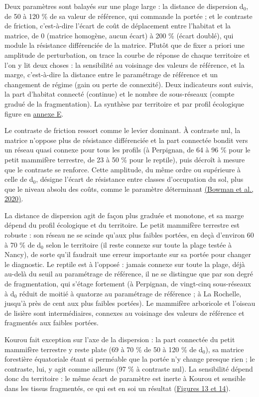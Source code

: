 \documentclass[a4paper,11pt]{report}
\begin{document}
Deux paramètres sont balayés sur une plage large : la distance de dispersion d$_{0}$, de 50 à 120 \% de sa valeur de référence, qui commande la portée ; et le contraste de friction, c'est-à-dire l'écart de coût de déplacement entre l'habitat et la matrice, de 0 (matrice homogène, aucun écart) à 200 \% (écart doublé), qui module la résistance différenciée de la matrice. Plutôt que de fixer a priori une amplitude de perturbation, on trace la courbe de réponse de chaque territoire et l'on y lit deux choses : la sensibilité au voisinage des valeurs de référence, et la marge, c'est-à-dire la distance entre le paramétrage de référence et un changement de régime (gain ou perte de connexité). Deux indicateurs sont suivis, la part d'habitat connecté (continue) et le nombre de sous-réseaux (compte gradué de la fragmentation). La synthèse par territoire et par profil écologique figure en \hyperref[annexe:E]{annexe E}.

Le contraste de friction ressort comme le levier dominant. À contraste nul, la matrice n'oppose plus de résistance différenciée et la part connectée bondit vers un réseau quasi connexe pour tous les profils (à Perpignan, de 64 à 96 \% pour le petit mammifère terrestre, de 23 à 50 \% pour le reptile), puis décroît à mesure que le contraste se renforce. Cette amplitude, du même ordre ou supérieure à celle de d$_{0}$, désigne l'écart de résistance entre classes d'occupation du sol, plus que le niveau absolu des coûts, comme le paramètre déterminant \hyperref[sec:bibliographie]{(Bowman et al., 2020)}.

La distance de dispersion agit de façon plus graduée et monotone, et sa marge dépend du profil écologique et du territoire. Le petit mammifère terrestre est robuste : son réseau ne se scinde qu'aux plus faibles portées, en deçà d'environ 60 à 70 \% de d$_{0}$ selon le territoire (il reste connexe sur toute la plage testée à Nancy), de sorte qu'il faudrait une erreur importante sur sa portée pour changer le diagnostic. Le reptile est à l'opposé : jamais connexe sur toute la plage, déjà au-delà du seuil au paramétrage de référence, il ne se distingue que par son degré de fragmentation, qui s'étage fortement (à Perpignan, de vingt-cinq sous-réseaux à d$_{0}$ réduit de moitié à quatorze au paramétrage de référence ; à La Rochelle, jusqu'à près de cent aux plus faibles portées). Le mammifère arboricole et l'oiseau de lisière sont intermédiaires, connexes au voisinage des valeurs de référence et fragmentés aux faibles portées.

Kourou fait exception sur l'axe de la dispersion : la part connectée du petit mammifère terrestre y reste plate (69 à 70 \% de 50 à 120 \% de d$_{0}$), sa matrice forestière équatoriale étant si perméable que la portée n'y change presque rien ; le contraste, lui, y agit comme ailleurs (97 \% à contraste nul). La sensibilité dépend donc du territoire : le même écart de paramètre est inerte à Kourou et sensible dans les tissus fragmentés, ce qui est en soi un résultat (\hyperref[fig:13]{Figures 13 et 14}).
\end{document}
